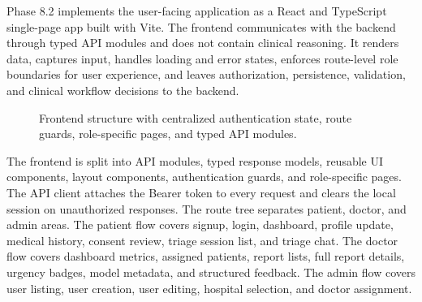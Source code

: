 Phase 8.2 implements the user-facing application as a React and TypeScript single-page app built with Vite. The frontend communicates with the backend through typed API modules and does not contain clinical reasoning. It renders data, captures input, handles loading and error states, enforces route-level role boundaries for user experience, and leaves authorization, persistence, validation, and clinical workflow decisions to the backend.

\begin{figure}[htbp]
\centering
{}
\caption{Frontend structure with centralized authentication state, route guards, role-specific pages, and typed API modules.}
\label{fig:frontend_application_structure}
\end{figure}

The frontend is split into API modules, typed response models, reusable UI components, layout components, authentication guards, and role-specific pages. The API client attaches the Bearer token to every request and clears the local session on unauthorized responses. The route tree separates patient, doctor, and admin areas. The patient flow covers signup, login, dashboard, profile update, medical history, consent review, triage session list, and triage chat. The doctor flow covers dashboard metrics, assigned patients, report lists, full report details, urgency badges, model metadata, and structured feedback. The admin flow covers user listing, user creation, user editing, hospital selection, and doctor assignment.

